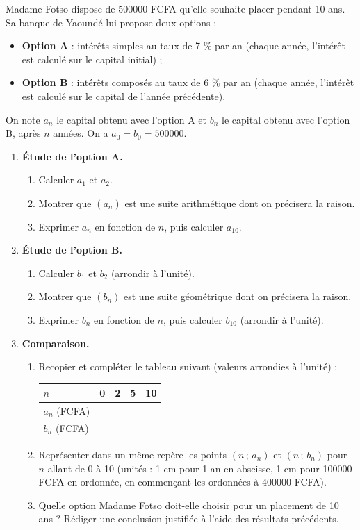 \documentclass[11pt]{article}
\begin{document}
\begin{exercice}
Madame Fotso dispose de \num{500000} FCFA qu'elle souhaite placer pendant 10 ans. Sa banque de Yaoundé lui propose deux options :
\begin{itemize}
\item \textbf{Option A} : intérêts simples au taux de 7 \% par an (chaque année, l'intérêt est calculé sur le capital initial) ;
\item \textbf{Option B} : intérêts composés au taux de 6 \% par an (chaque année, l'intérêt est calculé sur le capital de l'année précédente).
\end{itemize}
On note $a_n$ le capital obtenu avec l'option A et $b_n$ le capital obtenu avec l'option B, après $n$ années. On a $a_0 = b_0 = \num{500000}$.
\begin{enumerate}
\item \textbf{Étude de l'option A.}
\begin{enumerate}
\item Calculer $a_1$ et $a_2$.
\item Montrer que $(a_n)$ est une suite arithmétique dont on précisera la raison.
\item Exprimer $a_n$ en fonction de $n$, puis calculer $a_{10}$.
\end{enumerate}
\item \textbf{Étude de l'option B.}
\begin{enumerate}
\item Calculer $b_1$ et $b_2$ (arrondir à l'unité).
\item Montrer que $(b_n)$ est une suite géométrique dont on précisera la raison.
\item Exprimer $b_n$ en fonction de $n$, puis calculer $b_{10}$ (arrondir à l'unité).
\end{enumerate}
\item \textbf{Comparaison.}
\begin{enumerate}
\item Recopier et compléter le tableau suivant (valeurs arrondies à l'unité) :
\begin{center}
\begin{tabularx}{\linewidth}{|l|X|X|X|X|}\hline
$n$ & 0 & 2 & 5 & 10 \\ \hline
$a_n$ (FCFA) & & & & \\ \hline
$b_n$ (FCFA) & & & & \\ \hline
\end{tabularx}
\end{center}
\item Représenter dans un même repère les points $(n\,;\,a_n)$ et $(n\,;\,b_n)$ pour $n$ allant de 0 à 10 (unités : 1 cm pour 1 an en abscisse, 1 cm pour \num{100000} FCFA en ordonnée, en commençant les ordonnées à \num{400000} FCFA).
\item Quelle option Madame Fotso doit-elle choisir pour un placement de 10 ans ? Rédiger une conclusion justifiée à l'aide des résultats précédents.
\end{enumerate}
\end{enumerate}
\end{exercice}
\end{document}
